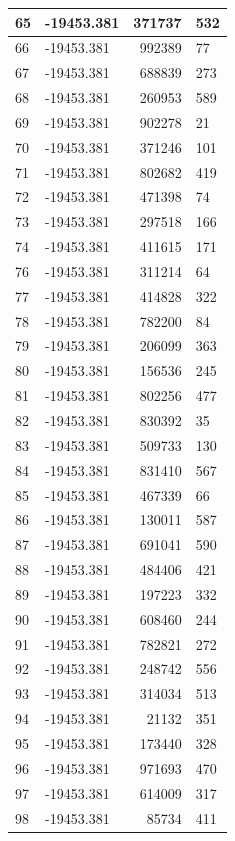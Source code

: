 \documentclass[]{book}
\theoremstyle{definition}
\theoremstyle{definition}
\theoremstyle{definition}
\theoremstyle{remark}
\begin{document}
\begin{tabular}{l|l|r|l}
\hline
65 & -19453.381 & 371737 & 532\\
\hline
66 & -19453.381 & 992389 & 77\\
\hline
67 & -19453.381 & 688839 & 273\\
\hline
68 & -19453.381 & 260953 & 589\\
\hline
69 & -19453.381 & 902278 & 21\\
\hline
70 & -19453.381 & 371246 & 101\\
\hline
71 & -19453.381 & 802682 & 419\\
\hline
72 & -19453.381 & 471398 & 74\\
\hline
73 & -19453.381 & 297518 & 166\\
\hline
74 & -19453.381 & 411615 & 171\\
\hline
76 & -19453.381 & 311214 & 64\\
\hline
77 & -19453.381 & 414828 & 322\\
\hline
78 & -19453.381 & 782200 & 84\\
\hline
79 & -19453.381 & 206099 & 363\\
\hline
80 & -19453.381 & 156536 & 245\\
\hline
81 & -19453.381 & 802256 & 477\\
\hline
82 & -19453.381 & 830392 & 35\\
\hline
83 & -19453.381 & 509733 & 130\\
\hline
84 & -19453.381 & 831410 & 567\\
\hline
85 & -19453.381 & 467339 & 66\\
\hline
86 & -19453.381 & 130011 & 587\\
\hline
87 & -19453.381 & 691041 & 590\\
\hline
88 & -19453.381 & 484406 & 421\\
\hline
89 & -19453.381 & 197223 & 332\\
\hline
90 & -19453.381 & 608460 & 244\\
\hline
91 & -19453.381 & 782821 & 272\\
\hline
92 & -19453.381 & 248742 & 556\\
\hline
93 & -19453.381 & 314034 & 513\\
\hline
94 & -19453.381 & 21132 & 351\\
\hline
95 & -19453.381 & 173440 & 328\\
\hline
96 & -19453.381 & 971693 & 470\\
\hline
97 & -19453.381 & 614009 & 317\\
\hline
98 & -19453.381 & 85734 & 411\\

\end{tabular}
\end{document}
